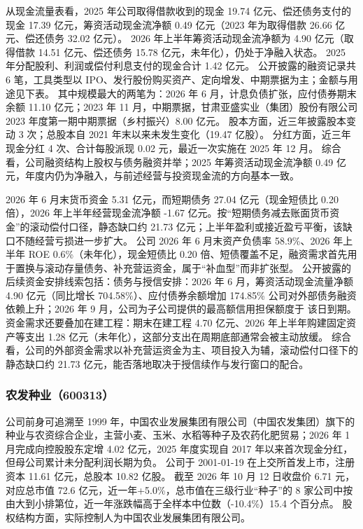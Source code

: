  从现金流量表看，2025 年公司取得借款收到的现金 19.74 亿元、偿还债务支付的现金 17.39 亿元，筹资活动现金流净额 0.49 亿元（2023 年为取得借款 26.66 亿元、偿还债务 32.02 亿元）。 2026 年上半年筹资活动现金流净额为 4.90 亿元（取得借款 14.51 亿元、偿还债务 15.78 亿元，未年化），仍处于净融入状态。 2025 年分配股利、利润或偿付利息支付的现金合计 1.42 亿元。 公开披露的融资记录共 6 笔，工具类型以 IPO、发行股份购买资产、定向增发、中期票据为主；金额与用途见下表。 其中规模最大的两笔为：2026 年 6 月，计息负债扩张，应付债券期末余额 11.10 亿元；2023 年 11 月，中期票据，甘肃亚盛实业（集团）股份有限公司 2023 年度第一期中期票据（乡村振兴）8.00 亿元。 股本方面，近三年披露股本变动 3 次；总股本自 2021 年末以来未发生变化（19.47 亿股）。 分红方面，近三年现金分红 4 次、合计每股派现 0.02 元，最近一次实施在 2025 年 12 月。 综合看，公司融资结构上股权与债务融资并举；2025 年筹资活动现金流净额 0.49 亿元，年度内仍为净融入，与前述经营与投资现金流的方向基本一致。

 2026 年 6 月末货币资金 5.31 亿元，而短期债务 27.04 亿元（现金短债比 0.20 倍），2026 年上半年经营现金流净额 -1.67 亿元。按“短期债务减去账面货币资金”的滚动偿付口径，静态缺口约 21.73 亿元；上半年盈利或接近盈亏平衡，该缺口不随经营亏损进一步扩大。 公司 2026 年 6 月末资产负债率 58.9\%、2026 年上半年 ROE 0.6\%（未年化），现金短债比 0.20 倍、短债覆盖不足，融资需求首先用于置换与滚动存量债务、补充营运资金，属于“补血型”而非扩张型。 公开披露的后续资金安排线索包括：债务与授信安排：2026 年 6 月，筹资活动现金流量净额 4.90 亿元（同比增长 704.58\%）、应付债券余额增加 174.85\% 公司对外部债务融资依赖上升；2026 年 9 月，公司为子公司提供的最高额信用担保额度于 该日到期。 资金需求还要叠加在建工程：期末在建工程 4.70 亿元、2026 年上半年购建固定资产等支出 1.28 亿元（未年化），这部分支出在周期底部通常会被主动放缓。 综合看，公司的外部资金需求以补充营运资金为主、项目投入为辅，滚动偿付口径下的静态缺口约 21.73 亿元，能否落地取决于授信续作与发行窗口的配合。




\subsubsection{农发种业（600313）}
\label{co:600313}

 公司前身可追溯至 1999 年，中国农业发展集团有限公司（中国农发集团）旗下的种业与农资综合企业，主营小麦、玉米、水稻等种子及农药化肥贸易；2026 年 1 月完成向控股股东定增 4.02 亿元，2025 年度实现自 2017 年以来首次现金分红，但母公司累计未分配利润长期为负。 公司于 2001-01-19 在上交所首发上市，注册资本 11.61 亿元，总股本 10.82 亿股。 截至 2026 年 10 月 12 日收盘价 6.71 元，对应总市值 72.6 亿元，近一年+5.0\%，总市值在三级行业“种子”的 8 家公司中按由大到小排第位，近一年涨跌幅高于全样本中位数（-10.4\%）15.4 个百分点。 股权结构方面，实际控制人为中国农业发展集团有限公司。

